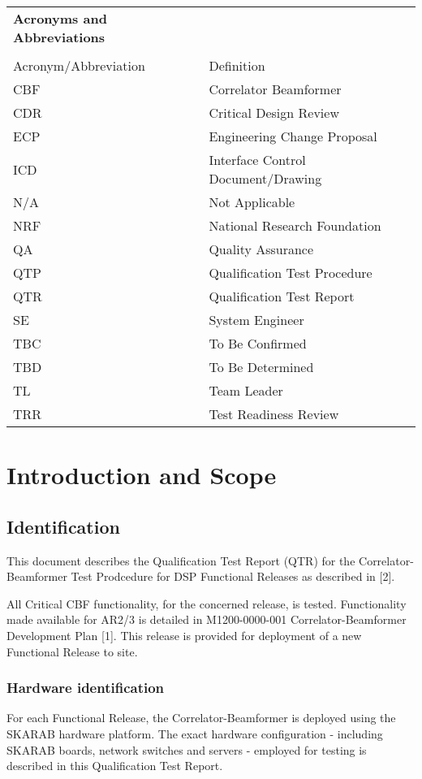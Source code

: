 \begin{longtable}{ll}
	{\bf\LARGE Acronyms and Abbreviations} & \\\\
	Acronym/Abbreviation & Definition \\
	CBF & Correlator Beamformer \\
	CDR & Critical Design Review \\
	ECP & Engineering Change Proposal \\
	ICD & Interface Control Document/Drawing \\
	N/A & Not Applicable \\
	NRF & National Research Foundation \\
	QA  & Quality Assurance \\
	QTP & Qualification Test Procedure \\
	QTR & Qualification Test Report \\
	SE  & System Engineer \\
	TBC & To Be Confirmed \\
	TBD & To Be Determined \\
	TL  & Team Leader \\
	TRR & Test Readiness Review \\
\end{longtable}

\chapter{Introduction and Scope}
\section{Identification}
This document describes the Qualification Test Report (QTR) for the Correlator-Beamformer Test Prodcedure for DSP Functional Releases as described in [2].\newline

All Critical CBF functionality, for the concerned release, is tested. Functionality made available for AR2/3 is detailed in M1200-0000-001 Correlator-Beamformer Development Plan [1]. This release is provided for deployment of a new Functional Release to site.\newline

\subsection{Hardware identification}
For each Functional Release, the Correlator-Beamformer is deployed using the SKARAB hardware platform. The exact hardware configuration - including SKARAB boards, network switches and servers - employed for testing is described in this Qualification Test Report.

